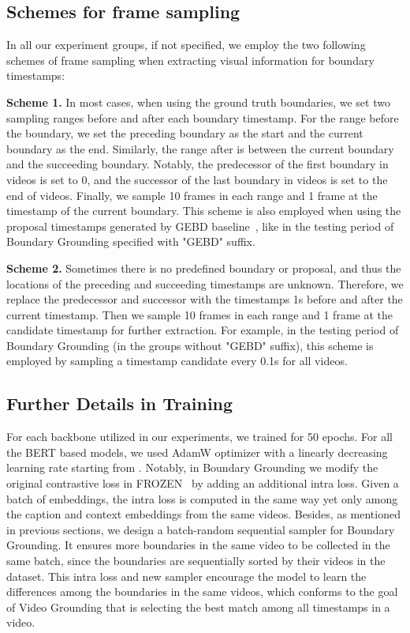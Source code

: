 \documentclass[runningheads]{llncs}
\begin{document}
\subsection{Schemes for frame sampling}
In all our experiment groups, if not specified, we employ the two following schemes of frame sampling when extracting visual information for boundary timestamps: 

\textbf{Scheme 1.} In most cases, when using the ground truth boundaries, we set two sampling ranges before and after each boundary timestamp. For the range before the boundary, we set the preceding boundary as the start and the current boundary as the end. Similarly, the range after is between the current boundary and the succeeding boundary. Notably, the predecessor of the first boundary in videos is set to 0, and the successor of the last boundary in videos is set to the end of videos. Finally, we sample 10 frames in each range and 1 frame at the timestamp of the current boundary. This scheme is also employed when using the proposal timestamps generated by GEBD baseline~\cite{shou2021generic}, like in the testing period of Boundary Grounding specified with "GEBD" suffix. 

\textbf{Scheme 2.} Sometimes there is no predefined boundary or proposal, and thus the locations of the preceding and succeeding timestamps are unknown. Therefore, we replace the predecessor and successor with the timestamps 1s before and after the current timestamp. Then we sample 10 frames in each range and 1 frame at the candidate timestamp for further extraction. For example, in the testing period of Boundary Grounding (in the groups without "GEBD" suffix), this scheme is employed by sampling a timestamp candidate every 0.1s for all videos.


\subsection{Further Details in Training}

For each backbone utilized in our experiments, we trained for 50 epochs. For all the BERT based models, we used AdamW optimizer with a linearly decreasing learning rate starting from . Notably, in Boundary Grounding we modify the original contrastive loss in FROZEN~\cite{bain2021frozen} by adding an additional intra loss. Given a batch of embeddings, the intra loss is computed in the same way yet only among the caption and context embeddings from the same videos. Besides, as mentioned in previous sections, we design a batch-random sequential sampler for Boundary Grounding. It ensures more boundaries in the same video to be collected in the same batch, since the boundaries are sequentially sorted by their videos in the dataset. This intra loss and new sampler encourage the model to learn the differences among the boundaries in the same videos, which conforms to the goal of Video Grounding that is selecting the best match among all timestamps in a video.
\end{document}
